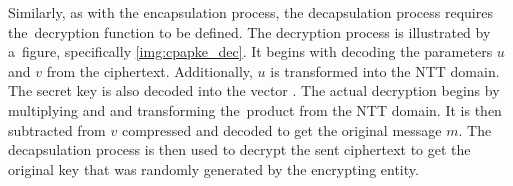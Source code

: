 Similarly, as with the encapsulation process, the decapsulation process requires the~decryption function to be defined. The decryption process is illustrated by a~figure, specifically \ref{img:cpapke_dec}. It begins with decoding the parameters $u$ and $v$ from the ciphertext. Additionally, $u$ is transformed into the NTT domain. The secret key is also decoded into the vector . The actual decryption begins by multiplying  and  and transforming the~product from the NTT domain. It is then subtracted from $v$ compressed and decoded to get the original message $m$. The decapsulation process is then used to decrypt the sent ciphertext to get the original key that was randomly generated by the encrypting entity.

